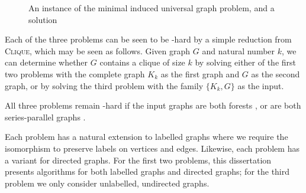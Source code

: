 \begin{figure}[htb]
{\quad
        \label{fig:ind-univ-solution}
    }
    \caption{An instance of the minimal induced universal graph problem, and a solution}
    \label{fig:induced-universal-example}
\end{figure}

Each
of the three problems can be seen to be \NP-hard by a simple reduction from
\textsc{Clique}, which may be seen as follows.
Given graph $G$ and natural number $k$, we can determine whether $G$ contains a clique
of size $k$ by solving either of the first two problems with the complete graph $K_k$ as
the first graph and $G$ as the second graph, or by solving the third problem with the family
$\{K_k, G\}$ as the input.

All three problems remain \NP-hard if the input graphs are both forests
\citep{DBLP:books/fm/GareyJ79}, or are both series-parallel graphs
\citep{syslo1982induced}.

Each problem has a natural extension to labelled graphs
where we require the isomorphism to preserve labels on vertices and edges.
Likewise, each problem has a variant for directed graphs.
For the first two problems, this dissertation presents algorithms for both
labelled graphs and directed graphs; for the third problem we only consider
unlabelled, undirected graphs.

